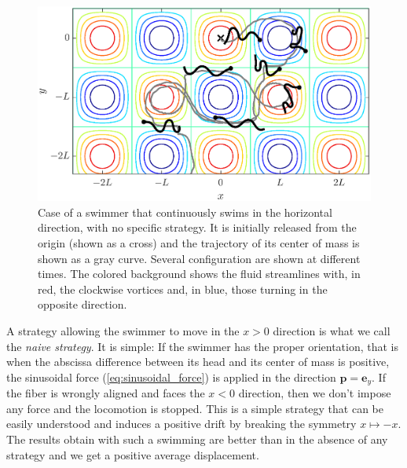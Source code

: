 \documentclass[aps,prl,preprint,groupedaddress]{revtex4-2}
\begin{document}
\begin{figure}[ht]
  \centerline{\includegraphics[width=\columnwidth]{displ_nostrategy}}
  \caption{\label{fig:displ_nostrategy} Case of a swimmer that continuously swims in the horizontal direction, with no specific strategy. It is initially released from the origin (shown as a cross) and the trajectory of its center of mass is shown as a gray curve. Several configuration are shown at different times. The colored background shows the fluid streamlines with, in red, the clockwise vortices and, in blue, those turning in the opposite direction.}
\end{figure}

A strategy allowing the swimmer to move in the $x>0$ direction is what we call the \textit{naive strategy}. It is simple: If the swimmer has the proper orientation, that is when the abscissa difference between its head and its center of mass is positive, the sinusoidal force (\ref{eq:sinusoidal_force}) is applied in the direction $\bm p = \bm e_y$. If the fiber is wrongly aligned and faces the $x<0$ direction, then we don't impose any force and the locomotion is stopped. This is a simple strategy that can be easily understood and induces a positive drift by breaking the symmetry $x\mapsto-x$. The results obtain with such a swimming are better than in the absence of any strategy and we get a positive average displacement. 
\end{document}
